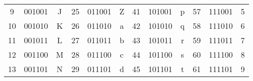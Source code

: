 \documentclass[a4paper,11pt]{article}
\begin{document}
\begin{table}[h]
\begin{tabular}{ccc|ccc|ccc|ccc}
		\rowcolor[HTML]{F8F9FA}
		{\color[HTML]{202122} 9}              & {\color[HTML]{202122} 001001}          & {\color[HTML]{202122} J}             & {\color[HTML]{202122} 25}             & {\color[HTML]{202122} 011001}          & {\color[HTML]{202122} Z}             & {\color[HTML]{202122} 41}             & {\color[HTML]{202122} 101001}          & {\color[HTML]{202122} p}             & {\color[HTML]{202122} 57}             & {\color[HTML]{202122} 111001}          & {\color[HTML]{202122} 5}             \\
		\rowcolor[HTML]{F8F9FA}
		{\color[HTML]{202122} 10}             & {\color[HTML]{202122} 001010}          & {\color[HTML]{202122} K}             & {\color[HTML]{202122} 26}             & {\color[HTML]{202122} 011010}          & {\color[HTML]{202122} a}             & {\color[HTML]{202122} 42}             & {\color[HTML]{202122} 101010}          & {\color[HTML]{202122} q}             & {\color[HTML]{202122} 58}             & {\color[HTML]{202122} 111010}          & {\color[HTML]{202122} 6}             \\
		\rowcolor[HTML]{F8F9FA}
		{\color[HTML]{202122} 11}             & {\color[HTML]{202122} 001011}          & {\color[HTML]{202122} L}             & {\color[HTML]{202122} 27}             & {\color[HTML]{202122} 011011}          & {\color[HTML]{202122} b}             & {\color[HTML]{202122} 43}             & {\color[HTML]{202122} 101011}          & {\color[HTML]{202122} r}             & {\color[HTML]{202122} 59}             & {\color[HTML]{202122} 111011}          & {\color[HTML]{202122} 7}             \\
		\rowcolor[HTML]{F8F9FA}
		{\color[HTML]{202122} 12}             & {\color[HTML]{202122} 001100}          & {\color[HTML]{202122} M}             & {\color[HTML]{202122} 28}             & {\color[HTML]{202122} 011100}          & {\color[HTML]{202122} c}             & {\color[HTML]{202122} 44}             & {\color[HTML]{202122} 101100}          & {\color[HTML]{202122} s}             & {\color[HTML]{202122} 60}             & {\color[HTML]{202122} 111100}          & {\color[HTML]{202122} 8}             \\
		\rowcolor[HTML]{F8F9FA}
		{\color[HTML]{202122} 13}             & {\color[HTML]{202122} 001101}          & {\color[HTML]{202122} N}             & {\color[HTML]{202122} 29}             & {\color[HTML]{202122} 011101}          & {\color[HTML]{202122} d}             & {\color[HTML]{202122} 45}             & {\color[HTML]{202122} 101101}          & {\color[HTML]{202122} t}             & {\color[HTML]{202122} 61}             & {\color[HTML]{202122} 111101}          & {\color[HTML]{202122} 9}             \\

\end{tabular}
\end{table}
\end{document}
